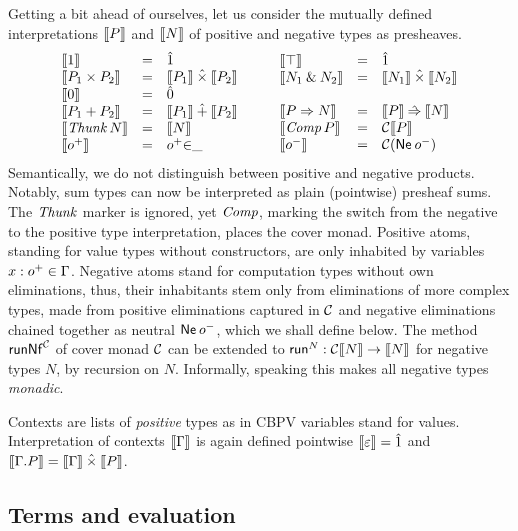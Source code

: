 \documentclass[a4paper,USenglish,cleveref, autoref]{lipics-v2019}
\begin{document}
Getting a bit ahead of ourselves, let us consider the
mutually defined interpretations
$\den P$ and $\den N$ of positive and negative types as presheaves.
\[
\begin{array}{lcl}
  \den{\tyone} & = & \hatone \\
  \den{P_1 \times P_2} & = & \den{P_1} \hattimes \den{P_2} \\
  \den{\tyzero} & = & \hatzero \\
  \den{P_1 + P_2} & = & \den{P_1} \hatplus \den{P_2} \\
  \den{\Thunk N} & = & \den N \\
  \den{\patom} & = & \patom{\in}\_ \\
\end{array}
\qquad
\begin{array}{lcl}
  \den{\top} & = & \hatone \\
  \den{N_1 \ntimes N_2} & = & \den{N_1} \hattimes \den{N_2} \\
  \\
  \den{P \To N} & = & \den P \hatto \den N \\
  \den{\Comp P} & = & \C \den P \\
  \den{\natom}  & = & \C (\tNe\, \natom) \\
\end{array}
\]
Semantically, we do not distinguish between positive and negative
products.  Notably, sum types can now be interpreted as plain
(pointwise) presheaf
sums.  The $\tThunk$ marker is ignored, yet $\tComp$, marking the
switch from the negative to the positive type interpretation, places
the cover monad.  Positive atoms, standing for value types without
constructors, are only inhabited by variables $x : \patom \in \Gamma$.
Negative atoms stand for computation types without own eliminations,
thus, their inhabitants stem only from eliminations of more complex
types, made from positive eliminations captured in $\C$ and negative
eliminations chained together as neutral $\tNe\,\natom$, which we
shall define below.
The method $\trunNf[\C]$ of cover monad $\C$ can be extended to
$\trun^N : \C \den N \to \den N$ for negative types $N$, by recursion
on $N$.  Informally, speaking this makes all negative types \emph{monadic}.

Contexts are lists of \emph{positive} types as in CBPV variables stand
for values.  Interpretation of contexts $\den \Gamma$ is again defined
pointwise $\den \cempty = \hatone$ and
$\den{\cext \Gamma P} = \den \Gamma \hattimes \den P$.

\subsection{Terms and evaluation}
\end{document}
